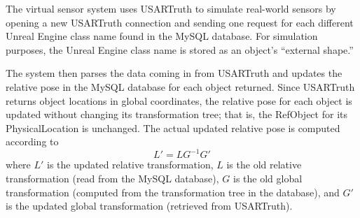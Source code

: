 The virtual sensor system uses USARTruth to simulate real-world sensors by opening a new USARTruth connection and sending one request for each different Unreal Engine class name found in the MySQL database. For simulation purposes, the Unreal Engine class name is stored as an object's ``external shape.''

The system then parses the data coming in from USARTruth and updates the relative pose in the MySQL database for each object returned. Since USARTruth returns object locations in global coordinates, the relative pose for each object is updated without changing its transformation tree; that is, the RefObject for its PhysicalLocation is unchanged. The actual updated relative pose is computed according to
\begin{equation}
L' = LG^{-1}G'
\end{equation}
where $L'$ is the updated relative transformation, $L$ is the old relative transformation (read from the MySQL database), $G$ is the old global transformation (computed from the transformation tree in the database), and $G'$ is the updated global transformation (retrieved from USARTruth).